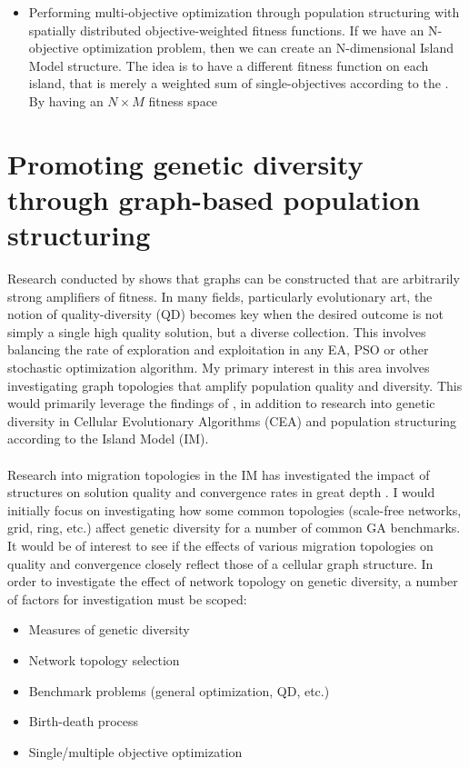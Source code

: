 \documentclass[10pt,a4paper]{article}
\begin{document}
\begin{itemize}
		\item Performing multi-objective optimization through population structuring with spatially distributed objective-weighted fitness functions.
		If we have an N-objective optimization problem, then we can create an N-dimensional Island Model structure.
		The idea is to have a different fitness function on each island, that is merely a weighted sum of single-objectives according to the .
		By having an $N \times M$ fitness space
		
	\end{itemize}
	
	\section{Promoting genetic diversity through graph-based population structuring}
	Research conducted by \citet{graph-amplifiers} shows that graphs can be constructed that are arbitrarily strong amplifiers of fitness.
	In many fields, particularly evolutionary art, the notion of quality-diversity (QD) becomes key when the desired outcome is not simply a single high quality solution, but a diverse collection.
	This involves balancing the rate of exploration and exploitation in any EA, PSO or other stochastic optimization algorithm.
	My primary interest in this area involves investigating graph topologies that amplify population quality and diversity.
	This would primarily leverage the findings of \citet{graph-amplifiers}, in addition to research into genetic diversity in Cellular Evolutionary Algorithms (CEA) and population structuring according to the Island Model (IM).
	\\\\
	Research into migration topologies in the IM has investigated the impact of structures on solution quality and convergence rates in great depth \citep{rucinski2010impact}.
	I would initially focus on investigating how some common topologies (scale-free networks, grid, ring, etc.) affect genetic diversity for a number of common GA benchmarks.
	It would be of interest to see if the effects of various migration topologies on quality and convergence closely reflect those of a cellular graph structure.
	In order to investigate the effect of network topology on genetic diversity, a number of factors for investigation must be scoped:
	\begin{itemize}
		\item Measures of genetic diversity
		\item Network topology selection
		\item Benchmark problems (general optimization, QD, etc.)
		\item Birth-death process
		\item Single/multiple objective optimization
	\end{itemize}
\end{document}
